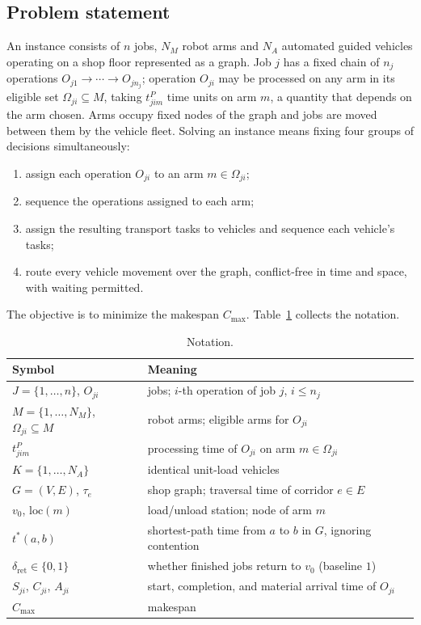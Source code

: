 \documentclass[manuscript,screen,review]{acmart}
\begin{document}
\subsection{Problem statement}

An instance consists of $n$ jobs, $N_M$ robot arms and $N_A$ automated guided
vehicles operating on a shop floor represented as a graph. Job $j$ has a fixed
chain of $n_j$ operations $O_{j1}\to\cdots\to O_{jn_j}$; operation $O_{ji}$ may
be processed on any arm in its eligible set $\Omega_{ji}\subseteq M$, taking
$t^P_{jim}$ time units on arm $m$, a quantity that depends on the arm chosen.
Arms occupy fixed nodes of the graph and jobs are moved between them by the
vehicle fleet. Solving an instance means fixing four groups of decisions
simultaneously:

\begin{enumerate}[label=(\roman*),leftmargin=*,topsep=2pt,itemsep=1pt]
\item assign each operation $O_{ji}$ to an arm $m\in\Omega_{ji}$;
\item sequence the operations assigned to each arm;
\item assign the resulting transport tasks to vehicles and sequence each
vehicle's tasks;
\item route every vehicle movement over the graph, conflict-free in time and
space, with waiting permitted.
\end{enumerate}

The objective is to minimize the makespan $C_{\max}$. Table~\ref{tab:notation}
collects the notation.

\begin{table}[t]
\caption{Notation.}
\label{tab:notation}
\small
\begin{tabular}{@{}ll@{}}
\toprule
Symbol & Meaning \\
\midrule
$J=\{1,\dots,n\}$, $O_{ji}$ & jobs; $i$-th operation of job $j$, $i\le n_j$ \\
$M=\{1,\dots,N_M\}$, $\Omega_{ji}\subseteq M$ & robot arms; eligible arms for $O_{ji}$ \\
$t^P_{jim}$ & processing time of $O_{ji}$ on arm $m\in\Omega_{ji}$ \\
$K=\{1,\dots,N_A\}$ & identical unit-load vehicles \\
$G=(V,E)$, $\tau_e$ & shop graph; traversal time of corridor $e\in E$ \\
$v_0$, $\mathrm{loc}(m)$ & load/unload station; node of arm $m$ \\
$t^{*}(a,b)$ & shortest-path time from $a$ to $b$ in $G$, ignoring contention \\
$\delta_{\mathrm{ret}}\in\{0,1\}$ & whether finished jobs return to $v_0$ (baseline $1$) \\
$S_{ji}$, $C_{ji}$, $A_{ji}$ & start, completion, and material arrival time of $O_{ji}$ \\
$C_{\max}$ & makespan \\
\bottomrule
\end{tabular}
\end{table}
\end{document}
